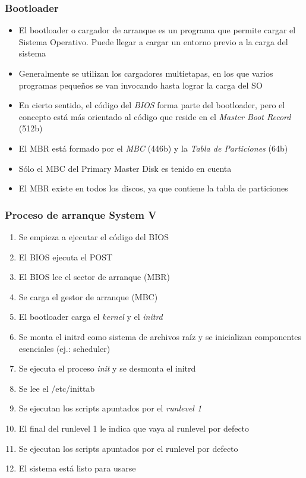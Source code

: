 \begin{frame}
  \frametitle{Bootloader}
  \begin{itemize}
  	\item El bootloader o cargador de arranque es un programa que permite cargar el Sistema Operativo. Puede llegar a cargar un entorno previo a la carga del sistema

  	\item Generalmente se utilizan los cargadores multietapas, en los que varios programas pequeños se van invocando hasta lograr la carga del SO

  	\item En cierto sentido, el código del \textit{BIOS} forma parte del bootloader, pero el concepto está más orientado al código que reside en el \textit{Master Boot Record} (512b)

  	\item El MBR está formado por el \textit{MBC} (446b) y la \textit{Tabla de Particiones} (64b)

  	\item Sólo el MBC del Primary Master Disk es tenido en cuenta

  	\item El MBR existe en todos los discos, ya que contiene la tabla de particiones
  \end{itemize}
\end{frame}

\begin{frame}
  \frametitle{Proceso de arranque \textbf{System V}}
  \begin{enumerate}
	\item Se empieza a ejecutar el código del BIOS
	\item El BIOS ejecuta el POST
	\item El BIOS lee el sector de arranque (MBR)
	\item Se carga el gestor de arranque (MBC)
	\item El bootloader carga el \textit{kernel} y el \textit{initrd}
	\item Se monta el initrd como sistema de archivos raíz y se inicializan componentes esenciales (ej.: scheduler)
	\item Se ejecuta el proceso \textit{init} y se desmonta el initrd
	\item Se lee el /etc/inittab
	\item Se ejecutan los scripts apuntados por el \textit{runlevel 1}
	\item El final del runlevel 1 le indica que vaya al runlevel por defecto
	\item Se ejecutan los scripts apuntados por el runlevel por defecto
	\item El sistema está listo para usarse
  \end{enumerate}
\end{frame}

